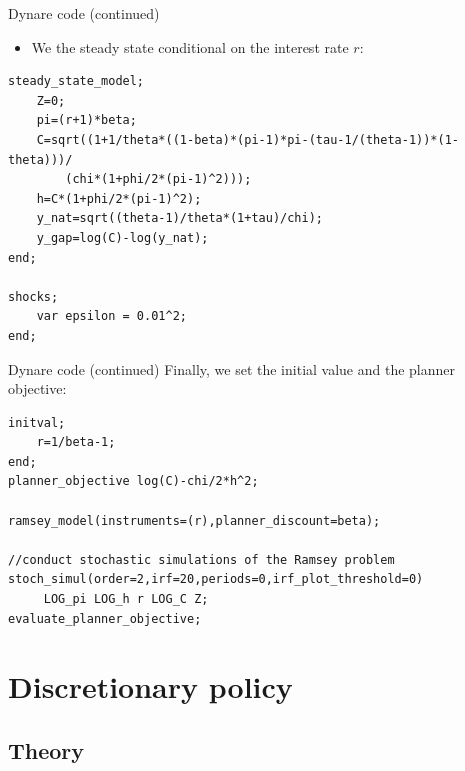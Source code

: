\documentclass[handout,usepdftitle=false,xcolor=dvipsnames,aspectratio=169]{beamer}
\begin{document}
\begin{frame}[fragile]{Dynare code (continued)}
  \begin{itemize}
    \item We the steady state conditional on the interest rate $r$:
  \end{itemize}

  \begin{verbatim}
steady_state_model;
    Z=0;
    pi=(r+1)*beta;
    C=sqrt((1+1/theta*((1-beta)*(pi-1)*pi-(tau-1/(theta-1))*(1-theta)))/
        (chi*(1+phi/2*(pi-1)^2)));
    h=C*(1+phi/2*(pi-1)^2);
    y_nat=sqrt((theta-1)/theta*(1+tau)/chi);
    y_gap=log(C)-log(y_nat);
end;

shocks;
    var epsilon = 0.01^2;
end;
\end{verbatim}
\end{frame}

\begin{frame}[fragile]{Dynare code (continued)}
  Finally, we set the initial value and the planner objective:
  \begin{verbatim}
initval;
    r=1/beta-1;
end;
planner_objective log(C)-chi/2*h^2;

ramsey_model(instruments=(r),planner_discount=beta); 

//conduct stochastic simulations of the Ramsey problem
stoch_simul(order=2,irf=20,periods=0,irf_plot_threshold=0)
     LOG_pi LOG_h r LOG_C Z;
evaluate_planner_objective;     
\end{verbatim}
\end{frame}


\section{Discretionary policy}

\subsection{Theory}
\end{document}
